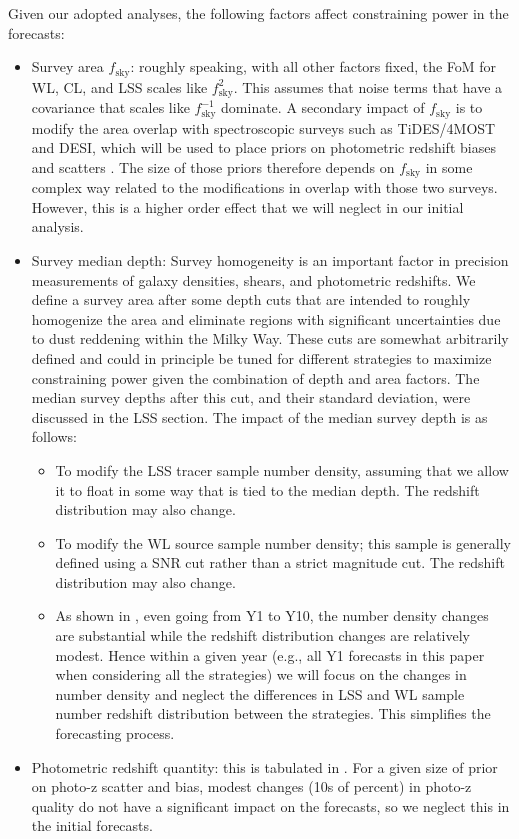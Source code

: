 Given our adopted analyses, the following factors affect constraining power in the forecasts:
\begin{itemize}
\item Survey area $f_\text{sky}$: roughly speaking, with all other factors fixed, the FoM for WL,
  CL, and LSS scales like $f_\text{sky}^2$.  This assumes that noise terms that have a covariance
  that scales like $f_\text{sky}^{-1}$ dominate.    A secondary impact of
  $f_\text{sky}$ is to modify the area overlap with spectroscopic surveys such as TiDES/4MOST and
  DESI, which will be used to place priors on photometric redshift biases and scatters
  . The size of those priors therefore depends on $f_\text{sky}$ in some complex
  way related to the modifications in overlap with those two surveys.  However, this is a higher
  order effect that we will neglect in our initial analysis.
\item Survey median depth: Survey homogeneity is an important factor in precision measurements of
  galaxy densities, shears, and photometric redshifts.  We define a survey area after some depth
  cuts that are intended to roughly homogenize the area and eliminate regions with significant
  uncertainties due to dust reddening within the Milky Way.  These cuts are somewhat arbitrarily
  defined and could in principle be tuned for different strategies to maximize constraining power
  given the combination of depth and area factors.  The median survey depths after this cut, and
  their standard deviation, were discussed in the LSS section.
  The impact of the median survey depth is as follows:
  \begin{itemize}
    \item To modify the LSS tracer sample number density, assuming that we allow it to float in some
      way that is tied to the median depth.  The redshift distribution may also change.
    \item To modify the WL source sample number density; this sample is generally defined using a
      SNR cut rather than a strict magnitude cut.  The redshift distribution may also change.
    \item As shown in \cite{DESCSRD2018}, even going from Y1 to Y10, the number density changes are
      substantial while the redshift distribution changes are relatively modest.  Hence within a
      given year (e.g., all Y1 forecasts in this paper when considering all the strategies) we will
      focus on the changes in number density and neglect the differences in LSS and WL sample number
      redshift distribution between the strategies.  This simplifies the forecasting process.
  \end{itemize}
\item Photometric redshift quantity: this is tabulated in .  For a given size of prior on
  photo-z scatter and bias, modest changes (10s of percent) in photo-z quality do not have a
  significant impact on the forecasts, so we neglect this in the initial forecasts.
\end{itemize}


